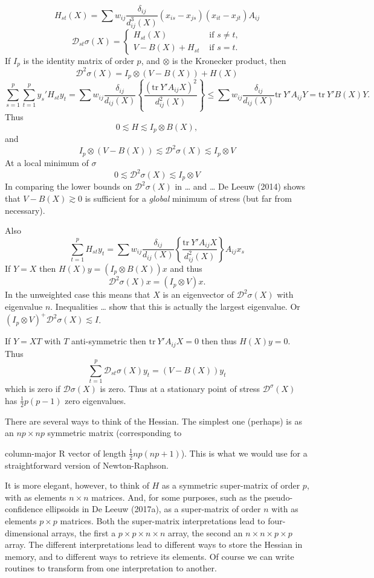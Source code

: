 \documentclass[
  12pt,
]{article}
\begin{document}
\[
H_{st}(X)=\sum   w_{ij}\frac{\delta_{ij}}{d_{ij}^3(X)}(x_{is}-x_{js})(x_{it}-x_{jt})A_{ij}
\] \[
\mathcal{D}_{st}\sigma(X)=\begin{cases}H_{st}(X)&\text{ if }s\not= t,\\
V-B(X)+H_{st}&\text{ if }s= t.
\end{cases}
\] If \(I_p\) is the identity matrix of order \(p\), and \(\otimes\) is the
Kronecker product, then \[
\mathcal{D}^2\sigma(X)=I_p\otimes(V - B(X))+ H(X)
\] \[
\sum_{s=1}^p\sum_{t=1}^p y_s'H_{st}y_t=\sum w_{ij}\frac{\delta_{ij}}{d_{ij}(X)}\left\{\frac{(\text{tr} \ Y'A_{ij}X)^2}{d_{ij}^2(X)}\right\}\leq\sum w_{ij}\frac{\delta_{ij}}{d_{ij}(X)}\text{tr}\ Y'A_{ij}Y=\text{tr}\ Y'B(X)Y.
\] Thus \[
0\lesssim H\lesssim I_p\otimes B(X),
\] and \[
I_p\otimes (V-B(X))\lesssim\mathcal{D}^2\sigma(X)\lesssim I_p\otimes V
\] At a local minimum of \(\sigma\) \[
0\lesssim\mathcal{D}^2\sigma(X)\lesssim I_p\otimes V
\] In comparing the lower bounds on \(\mathcal{D}^2\sigma(X)\) in \ldots{} and
\ldots{} De Leeuw (2014) shows that \(V-B(X)\gtrsim 0\) is sufficient for a
\emph{global} minimum of stress (but far from necessary).

Also \[
\sum_{t=1}^p H_{st}y_t=\sum w_{ij}\frac{\delta_{ij}}{d_{ij}(X)}\left\{\frac{\text{tr}\ Y'A_{ij}X }{d_{ij}^2(X)}\right\}A_{ij}x_s
\] If \(Y=X\) then \(H(X)y=(I_p\otimes B(X))x\) and thus
\[\mathcal{D}^2\sigma(X)x=(I_p\otimes V)x.\] In the unweighted case this
means that \(X\) is an eigenvector of \(\mathcal{D}^2\sigma(X)\) with
eigenvalue \(n\). Inequalities \ldots{} show that this is actually the largest
eigenvalue. Or \((I_p\otimes V)^+\mathcal{D}^2\sigma(X)\lesssim I\).

If \(Y=XT\) with \(T\) anti-symmetric then \(\text{tr}\ Y'A_{ij}X=0\) then
thus \(H(X)y=0\). Thus \[
\sum_{t=1}^p\mathcal{D}_{st}\sigma(X)y_t=(V-B(X))y_t
\] which is zero if \(\mathcal{D}\sigma(X)\) is zero. Thus at a stationary
point of stress \(\mathcal{D}^\sigma(X)\) has \(\frac12p(p-1)\) zero
eigenvalues.

There are several ways to think of the Hessian. The simplest one
(perhaps) is as an \(np\times np\) symmetric matrix (corresponding to

column-major R vector of length \(\frac12 np(np+1)\)). This is what we
would use for a straightforward version of Newton-Raphson.

It is more elegant, however, to think of \(H\) as a symmetric super-matrix
of order \(p\), with as elements \(n\times n\) matrices. And, for some
purposes, such as the pseudo-confidence ellipsoids in De Leeuw (2017a), as
a super-matrix of order \(n\) with as elements \(p\times p\) matrices. Both
the super-matrix interpretations lead to four-dimensional arrays, the
first a \(p\times p\times n\times n\) array, the second an
\(n\times n\times p\times p\) array. The different interpretations lead to
different ways to store the Hessian in memory, and to different ways to
retrieve its elements. Of course we can write routines to transform from
one interpretation to another.
\end{document}
